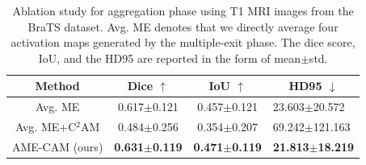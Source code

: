 
\begin{table}
\centering
\caption{Ablation study for aggregation phase using T1 MRI images from the BraTS dataset. Avg. ME denotes that we directly average four activation maps generated by the multiple-exit phase. The dice score, IoU, and the HD95 are reported in the form of mean$\pm$std.}
\label{Table:ablation_aggregation}
\small
\begin{tabular}{c|c|c|l}
\hline
Method                            & Dice $\uparrow$        & IoU $\uparrow$         & \multicolumn{1}{c}{HD95 $\downarrow$}           \\ \hline
Avg. ME                           & 0.617$\pm$0.121 & 0.457$\pm$0.121 & 23.603$\pm$20.572  \\
Avg. ME+C$^2$AM\cite{xie2022c2am} & 0.484$\pm$0.256 & 0.354$\pm$0.207 & 69.242$\pm$121.163 \\
AME-CAM (ours)                    & \textbf{0.631$\pm$0.119} & \textbf{0.471$\pm$0.119} & \textbf{21.813$\pm$18.219} \\ \hline
\end{tabular}
\end{table}